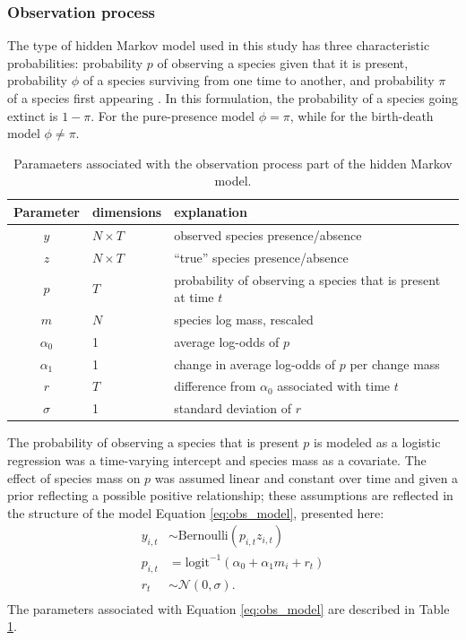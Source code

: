 \documentclass[12pt,letterpaper]{article}
\begin{document}
\subsubsection*{Observation process}
The type of hidden Markov model used in this study has three characteristic probabilities: probability \(p\) of observing a species given that it is present, probability \(\phi\) of a species surviving from one time to another, and probability \(\pi\) of a species first appearing \citep{Royle2008}. In this formulation, the probability of a species going extinct is \(1 - \pi\). For the pure-presence model \(\phi = \pi\), while for the birth-death model \(\phi \neq \pi\).

\begin{table}
  \centering
  \caption{Paramaeters associated with the observation process part of the hidden Markov model.}
  \begin{tabular}{c l l}
    Parameter & dimensions & explanation \\
    \hline
    \(y\) & \(N \times T\) & observed species presence/absence \\
    \(z\) & \(N \times T\) & ``true'' species presence/absence \\
    \(p\) & \(T\) & probability of observing a species that is present at time \(t\) \\
    \(m\) & \(N\) & species log mass, rescaled \\
    \(\alpha_{0}\) & 1 & average log-odds of \(p\) \\ %
    \(\alpha_{1}\) & 1 & change in average log-odds of \(p\) per change mass \\
    \(r\) & \(T\) & difference from \(\alpha_{0}\) associated with time \(t\) \\
    \(\sigma\) & 1 & standard deviation of \(r\) \\
  \end{tabular}
  \label{tab:obs_param}
\end{table}

The probability of observing a species that is present \(p\) is modeled as a logistic regression was a time-varying intercept and species mass as a covariate. The effect of species mass on \(p\) was assumed linear and constant over time and given a prior reflecting a possible positive relationship; these assumptions are reflected in the structure of the model Equation \ref{eq:obs_model}, presented here:
\begin{equation}
  \begin{aligned}
    y_{i, t} &\sim \text{Bernoulli}(p_{i, t} z_{i, t}) \\
    p_{i, t} &= \text{logit}^{-1}(\alpha_{0} + \alpha_{1} m_{i} + r_{t}) \\ 
    r_{t} &\sim \mathcal{N}(0, \sigma). \\
  \end{aligned}
  \label{eq:obs_model}
\end{equation}
The parameters associated with Equation \ref{eq:obs_model} are described in Table \ref{tab:obs_param}.
\end{document}
